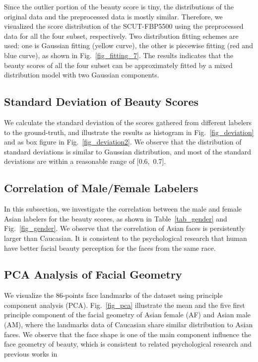 \documentclass[10pt,conference,a4paper]{IEEEtran}
\begin{document}
Since the outlier portion of the beauty score is tiny, the distributions of the original data and the preprocessed data is mostly similar. Therefore, we visualized the score distribution of the SCUT-FBP5500 using the preprocessed data for all the four subset, respectively. Two distribution fitting schemes are used: one is Gaussian fitting (yellow curve), the other is piecewise fitting (red and blue curve), as shown in Fig.~\ref{fig_fitting_7}. The results indicates that the beauty scores of all the four subset can be approximately fitted by a mixed distribution model with two Gaussian components.













\subsection{Standard Deviation of Beauty Scores}
We calculate the standard deviation of the scores gathered from different labelers to the ground-truth, and illustrate the results as histogram in Fig.~\ref{fig_deviation} and as box figure in Fig.~\ref{fig_deviation2}. We observe that the distribution of standard deviations is similar to Gaussian distribution, and most of the standard deviations are within a reasonable range of [0.6,~0.7].

\subsection{Correlation of Male/Female Labelers}
In this subsection, we investigate the correlation between the male and female Asian labelers for the beauty scores, as shown in Table~\ref{tab_gender} and Fig.~\ref{fig_gender}. We observe that the correlation of Asian faces is persistently larger than Caucasian. It is consistent to the psychological research that human have better facial beauty perception for the faces from the same race.

\subsection{PCA Analysis of Facial Geometry}
We visualize the 86-points face landmarks of the dataset using principle component analysis (PCA). Fig.~\ref{fig_pca} illustrate the mean and the five first principle component of the facial geometry of Asian female (AF) and Asian male (AM), where the landmarks data of Caucasian share similar distribution to Asian faces. We observe that the face shape is one of the main component influence the face geometry of beauty, which is consistent to related psychological research and previous works in~\cite{2011zhang,4}
\end{document}
